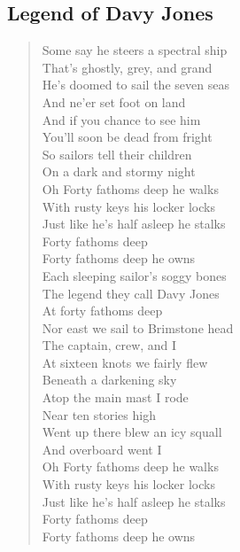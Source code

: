 \documentclass[11pt]{article}
\begin{document}
\subsection{Legend of Davy Jones}
\label{sec:org72ea57a}
\begin{verse}
Some say he steers a spectral ship\\
That's ghostly, grey, and grand\\
He's doomed to sail the seven seas\\
And ne'er set foot on land\\
\vspace*{1em}
And if you chance to see him\\
You'll soon be dead from fright\\
So sailors tell their children\\
On a dark and stormy night\\
\vspace*{1em}
Oh Forty fathoms deep he walks\\
With rusty keys his locker locks\\
Just like he's half asleep he stalks\\
Forty fathoms deep\\
Forty fathoms deep he owns\\
Each sleeping sailor's soggy bones\\
The legend they call Davy Jones\\
At forty fathoms deep\\
\vspace*{1em}
Nor east we sail to Brimstone head\\
The captain, crew, and I\\
At sixteen knots we fairly flew\\
Beneath a darkening sky\\
\vspace*{1em}
Atop the main mast I rode\\
Near ten stories high\\
Went up there blew an icy squall\\
And overboard went I\\
\vspace*{1em}
Oh Forty fathoms deep he walks\\
With rusty keys his locker locks\\
Just like he's half asleep he stalks\\
Forty fathoms deep\\
\vspace*{1em}
Forty fathoms deep he owns\\

\end{verse}
\end{document}
